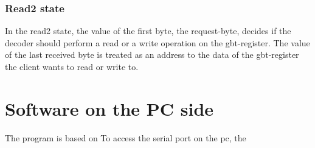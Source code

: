 \documentclass[main.tex]{subfiles}
\begin{document}
  \subsubsection{Read2 state}
  In the read2 state, the value of the first byte, the request-byte, decides if the decoder should perform a read or a write operation on the gbt-register. The value of the last received byte is treated as an address to the data of the gbt-register the client wants to read or write to.  

\section{Software on the PC side}
The program is based on 
To access the serial port on the \gls{pc}, the 
\end{document}
